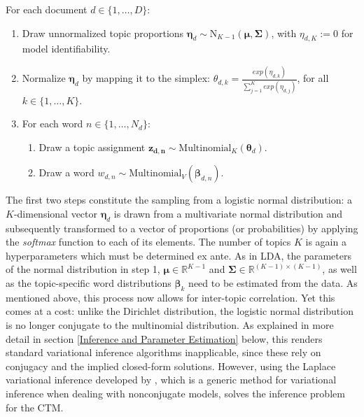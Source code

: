 \vspace{0.25cm}
\noindent
For each document $d \in \{1,\dots,D\}$:

\begin{enumerate}[{1)}]
\vspace{-0.25cm}
\item Draw unnormalized topic proportions $\boldsymbol{\eta}_d \sim \text{N}_{K-1}(\boldsymbol{\mu}, \boldsymbol{\Sigma})$, with $\eta_{d,K} := 0$ for model identifiability.
\vspace{-0.25cm}
\item Normalize $\boldsymbol{\eta}_d$ by mapping it to the simplex: $\theta_{d,k} = \frac{exp(\eta_{d,k})}{\sum_{j=1}^{K}exp(\eta_{d,j})}$, for all $k \in \{1,\dots,K\}$.
\vspace{-0.25cm}
\item For each word $n \in \{1,\dots,N_d\}$:
	\begin{enumerate}[{a)}]
	\vspace{-0.25cm}    
    \item Draw a topic assignment $\boldsymbol{z_{d,n}} \sim \text{Multinomial}_K(\boldsymbol{\theta}_d)$.
	\vspace{-0.25cm}    
    \item Draw a word $w_{d,n} \sim \text{Multinomial}_V(\boldsymbol{\beta}_{d,n})$.
	\end{enumerate}
\end{enumerate}

\noindent
The first two steps constitute the sampling from a logistic normal distribution: a $K$-dimensional vector $\boldsymbol{\eta}_d$ is drawn from a multivariate normal distribution and subsequently transformed to a vector of proportions (or probabilities) by applying the \textit{softmax} function to each of its elements. The number of topics $K$ is again a hyperparameters which must be determined ex ante. As in LDA, the parameters of the normal distribution in step 1, $\boldsymbol{\mu} \in \mathbb{R}^{K-1}$ and $\boldsymbol{\Sigma} \in \mathbb{R}^{(K-1) \times (K-1)}$, as well as the topic-specific word distributions $\boldsymbol{\beta}_k$ need to be estimated from the data. As mentioned above, this process now allows for inter-topic correlation. Yet this comes at a cost: unlike the Dirichlet distribution, the logistic normal distribution is no longer conjugate to the multinomial distribution. As explained in more detail in section \ref{Inference and Parameter Estimation} below, this renders standard variational inference algorithms inapplicable, since these rely on conjugacy and the implied closed-form solutions. However, using the Laplace variational inference developed by \cite{wang2013variational}, which is a generic method for variational inference when dealing with nonconjugate models, solves the inference problem for the CTM.

